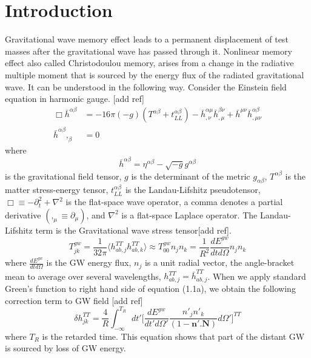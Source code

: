 \documentclass[prd,preprintnumbers,twocolumn,eqsecnum,floatfix,letter]{revtex4}
\begin{document}
\maketitle

\section{Introduction}
Gravitational wave memory effect leads to a permanent displacement of test masses after the gravitational wave has passed through it. Nonlinear memory effect also called Christodoulou memory, arises from a change in the radiative multiple moment that is sourced by the energy flux of the radiated gravitational wave. It can be understood in the following way. Consider the Einstein field equation in harmonic gauge. [add ref] 
\begin{subequations}
\begin{align}	
\Box \bar{h}^{\alpha \beta} & = -16\pi (-g)(T^{\alpha\beta} + t_{LL}^{\alpha\beta})-\bar{h}^{\alpha\mu}_{,\nu}\bar{h}^{\beta\nu}_{,\mu}+\bar{h}^{\mu\nu}\bar{h}^{\alpha\beta}_{,\mu\nu}\\
\bar{h}^{\alpha \beta},_{\beta} & = 0
\end{align}
\end{subequations}
where
\begin{equation}
\bar{h}^{\alpha \beta} = \eta^{\alpha\beta}-\sqrt{-g}g^{\alpha\beta} 
\end{equation}
is the gravitational field tensor, $g$ is the determinant of the metric $g_{\alpha\beta}$, $T^{\alpha\beta}$ is the matter stress-energy tensor, $t^{\alpha\beta}_{LL}$ is the Landau-Lifshitz pseudotensor, $\Box \equiv  -\partial^{2}_{t} + \nabla^{2}$ is the flat-space wave operator, a comma denotes a partial derivative $(,_{\mu}\equiv \partial_{\mu})$, and $\nabla^{2}$ is a flat-space Laplace operator. The Landau-Lifshitz term is the Gravitational wave stress tensor[add ref].
\begin{equation}
	T^{gw}_{jk}=\frac{1}{32\pi}\langle h^{TT}_{ab,j}h^{TT}_{ab,k}\rangle\approx T^{gw}_{00}n_{j}n_{k} = \frac{1}{R^{2}}\frac{dE^{gw}}{dt d\Omega}n_{j}n_{k}
\end{equation}
where $\frac{dE^{gw}}{dtd\Omega}$ is the GW energy flux, $n_{j}$ is a unit radial vector, the angle-bracket mean to average over several wavelengths, $h^{TT}_{ab,j}=\bar{h}^{TT}_{ab,j}$. When we apply standard Green's function to right hand side of equation (1.1a), we obtain the following correction term to GW field [add ref]
\begin{equation}
	\delta h^{TT}_{jk} = \frac{4}{R}\int_{-\infty}^{T_{R}} dt'\Bigg[ \frac{dE^{gw}}{dt'd\Omega'}\frac{n'_{j}n'_{k}}{(1-\boldsymbol{n'.N})}d\Omega'\Bigg]^{TT}
\end{equation}
where $T_{R}$ is the retarded time. This equation shows that part of the distant GW is sourced by loss of GW energy.
\end{document}
